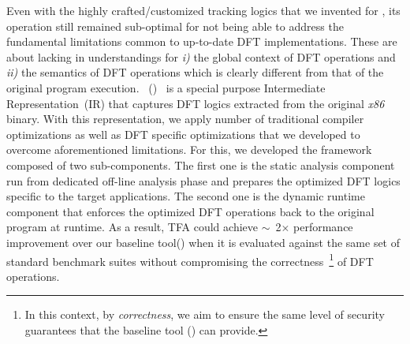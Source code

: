 \documentclass[letterpaper, 10pt]{article}
\begin{document}
\begin{small}
Even with the highly crafted/customized tracking logics that we invented for
\libdft, its operation still remained sub-optimal for not being able to address
the fundamental limitations common to up-to-date DFT implementations. These are
about lacking in understandings for {\it i)} the global context of DFT
operations and {\it ii)} the semantics of DFT operations which is clearly
different from that of the original program execution.
%
\TFAFull~(\TFA)~\cite{tfa:2012ndss} is a special purpose Intermediate
Representation~(IR) that captures DFT logics extracted from the original {\it
x86} binary. With this representation, we apply number of traditional compiler
optimizations as well as DFT specific optimizations that we developed to
overcome aforementioned limitations.
%
For this, we developed the framework composed of two sub-components.
The first one is the static analysis component run from dedicated
off-line analysis phase and prepares the optimized DFT logics specific to the
target applications. The second one is the dynamic runtime component that
enforces the optimized DFT operations back to the original program at runtime.
%
%
As a result, TFA could achieve \(\sim\)~2\(\times\) performance improvement
over  our baseline tool(\libdft) when it is evaluated against the same set of
standard benchmark suites without compromising the correctness~\footnote{In
        this context, by {\it correctness}, we aim to ensure the same level of
security guarantees that the baseline tool (\libdft) can provide.} of DFT
operations.


\end{small}
\end{document}
